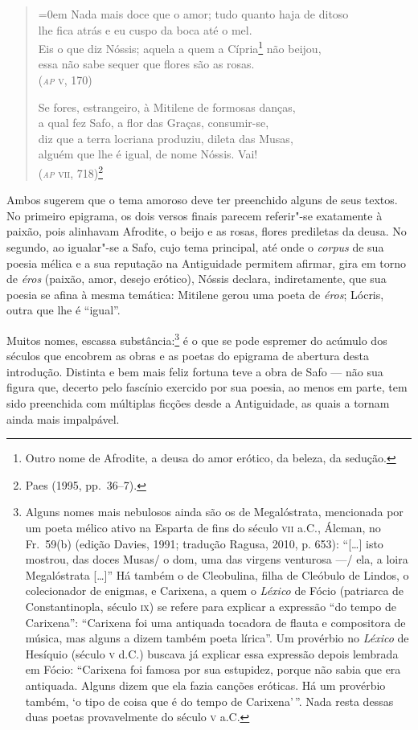 \begin{quote}\parindent=0em
Nada mais doce que o amor; tudo quanto haja de ditoso\\
lhe fica atrás e eu cuspo da boca até o mel.\\
Eis o que diz Nóssis; aquela a quem a Cípria\footnote{ Outro nome de
Afrodite, a deusa do amor erótico, da beleza, da sedução.} não beijou,\\
essa não sabe sequer que flores são as rosas.\\
\mbox{}\hfill (\textsc{\textit{ap} v}, 170)

\smallskip

Se fores, estrangeiro, à Mitilene de formosas danças,\\
a qual fez Safo, a flor das Graças, consumir-se,\\ 
diz que a terra locriana produziu, dileta das Musas,\\
alguém que lhe é igual, de nome Nóssis. Vai!\\
\mbox{}\hfill (\textsc{\textit{ap} vii}, 718)\footnote{ Paes (1995, pp.~36--7).}
\end{quote}

Ambos sugerem que o tema amoroso deve ter preenchido alguns de seus textos. No
primeiro epigrama, os dois versos finais parecem referir"-se exatamente à
paixão, pois alinhavam Afrodite, o beijo e as rosas, flores prediletas da
deusa. No segundo, ao igualar"-se a Safo, cujo tema principal, até onde o
\textit{corpus} de sua poesia mélica e a sua reputação na Antiguidade permitem
afirmar, gira em torno de \textit{éros} (paixão, amor, desejo erótico), Nóssis
declara, indiretamente, que sua poesia se afina à mesma temática: Mitilene
gerou uma poeta de \textit{éros}; Lócris, outra que lhe é ``igual”.

Muitos nomes, escassa substância:\footnote{ Alguns nomes mais nebulosos ainda são
os de Megalóstrata, mencionada por um poeta mélico ativo na Esparta de fins do
século \textsc{vii} a.C., Álcman, no Fr.~59(b) (edição Davies, 1991;
tradução Ragusa, 2010, p. 653): ``[\ldots{}] isto mostrou, das doces
Musas/ o dom, uma das virgens venturosa ---/ ela, a loira Megalóstrata [\ldots{}]'' Há
também o de Cleobulina, filha de Cleóbulo de Lindos, o colecionador de enigmas,
e Carixena, a quem o \textit{Léxico} de Fócio (patriarca de Constantinopla,
século \textsc{ix}) se refere para explicar a expressão ``do tempo de Carixena”:
``Carixena foi uma antiquada tocadora de flauta e compositora de música,
mas alguns a dizem também poeta lírica”. Um provérbio no \textit{Léxico} de
Hesíquio (século \textsc{v} d.C.) buscava já explicar essa expressão depois lembrada em
Fócio: ``Carixena foi famosa por sua estupidez, porque não sabia que era
antiquada. Alguns dizem que ela fazia canções eróticas. Há um provérbio também,
‘o tipo de coisa que é do tempo de Carixena’\,”. Nada resta dessas duas poetas
provavelmente do século \textsc{v} a.C.} é o que se pode espremer do acúmulo dos
séculos que encobrem as obras e as poetas do epigrama de abertura desta
introdução. Distinta e bem mais feliz fortuna teve a obra de Safo --- não sua
figura que, decerto pelo fascínio exercido por sua poesia, ao menos em parte,
tem sido preenchida com múltiplas ficções desde a Antiguidade, as quais a
tornam ainda mais impalpável. 

